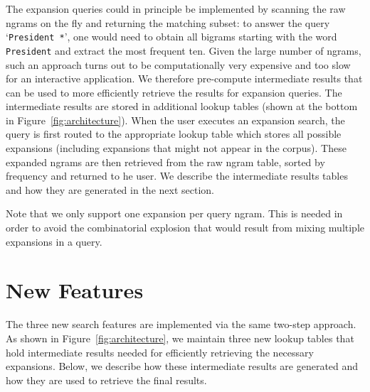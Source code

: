 \documentclass[11pt,a4paper]{article}
\newcommand{\query}[1]{\texttt{#1}}
\begin{document}
The expansion queries could in principle be implemented by scanning the raw ngrams on the fly and returning the matching subset: to answer the query `\query{President *}', one would need to obtain all bigrams starting with the word \query{President} and extract the most frequent ten. Given the large number of ngrams, such an approach turns out to be computationally very expensive and too slow for an interactive application. We therefore pre-compute intermediate results that can be used to more efficiently retrieve the results for expansion queries. The intermediate results are stored in additional lookup tables (shown at the bottom in Figure~\ref{fig:architecture}). When the user executes an expansion search, the query is first routed to the appropriate lookup table which stores all possible expansions (including expansions that might not appear in the corpus).  These expanded ngrams are then retrieved from the raw ngram table, sorted by frequency and returned to he user.
We describe the intermediate results tables and how they are generated in the next section.

Note that we only support one expansion per query ngram. This is needed in order to avoid the combinatorial explosion that would result from mixing multiple expansions in a query.


\section{New Features}
\label{sec:features}
The three new search features are implemented via the same two-step approach. As shown in Figure~\ref{fig:architecture}, we maintain three new lookup tables that hold intermediate results needed for efficiently retrieving the necessary expansions. Below, we describe how these intermediate results are generated and how they are used to retrieve the final results.
\end{document}

